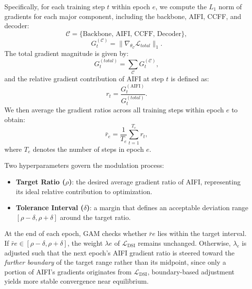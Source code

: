 Specifically, for each training step $t$ within epoch $e$, we compute the $L_1$ norm of gradients for each major component, including the backbone, AIFI, CCFF, and decoder:
\begin{equation}
  \mathcal{C} = \{\text{Backbone, AIFI, CCFF, Decoder}\},
  \label{eq:component}
\end{equation}
\begin{equation}
  G_t^{(\mathcal{C})} = \| \nabla_{\theta_\mathcal{C}} \mathcal{L}_{total} \|_1.
  \label{eq:grad}
\end{equation}
The total gradient magnitude is given by:
\begin{equation}
  G_t^{(total)} = \sum_\mathcal{C} G_t^{(\mathcal{C})},
  \label{eq:grad_total}
\end{equation}
and the relative gradient contribution of AIFI at step $t$ is defined as:
\begin{equation}
  r_t = \frac{G_t^{(\text{AIFI})}}{G_t^{(total)}}.
  \label{eq:aifi_ratio}
\end{equation}
We then average the gradient ratios across all training steps within epoch $e$ to obtain:
\begin{equation}
  \bar{r}_e = \frac{1}{T_e} \sum_{t=1}^{T_e} r_t,
  \label{eq:avg_aifi_ratio}
\end{equation}
where $T_e$ denotes the number of steps in epoch $e$.

Two hyperparameters govern the modulation process:

\begin{itemize}
\item \textbf{Target Ratio ($\rho$)}: the desired average gradient ratio of AIFI, representing its ideal relative contribution to optimization.
\item \textbf{Tolerance Interval ($\delta$)}: a margin that defines an acceptable deviation range $[\rho - \delta, \rho + \delta]$ around the target ratio.
\end{itemize}

At the end of each epoch, GAM checks whether $\bar{r}e$ lies within the target interval.
If $\bar{r}e \in [\rho - \delta, \rho + \delta]$, the weight $\lambda{e}$ of $\mathcal{L}_{\text{DSI}}$ remains unchanged.
Otherwise, $\lambda_{e}$ is adjusted such that the next epoch's AIFI gradient ratio is steered toward the \textit{further boundary} of the target range rather than its midpoint, since only a portion of AIFI’s gradients originates from $\mathcal{L}_{\text{DSI}}$, boundary-based adjustment yields more stable convergence near equilibrium.

